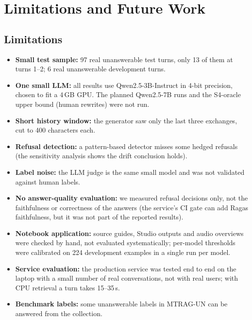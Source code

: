 \documentclass[11pt,a4paper]{report}
\newcommand{\sys}[1]{\textsf{#1}}
\begin{document}
\chapter{Limitations and Future Work}
\section{Limitations}
\begin{itemize}
\item \textbf{Small test sample:} 97 real unanswerable test turns, only 13 of them at turns 1--2; 6 real unanswerable development turns.
\item \textbf{One small LLM:} all results use Qwen2.5-3B-Instruct in 4-bit precision, chosen to fit a 4\,GB GPU. The planned Qwen2.5-7B runs and the \sys{S4-oracle} upper bound (human rewrites) were not run.
\item \textbf{Short history window:} the generator saw only the last three exchanges, cut to 400 characters each.
\item \textbf{Refusal detection:} a pattern-based detector misses some hedged refusals (the sensitivity analysis shows the drift conclusion holds).
\item \textbf{Label noise:} the LLM judge is the same small model and was not validated against human labels.
\item \textbf{No answer-quality evaluation:} we measured refusal decisions only, not the faithfulness or correctness of the answers (the service's CI gate can add Ragas faithfulness, but it was not part of the reported results).
\item \textbf{Notebook application:} source guides, Studio outputs and audio overviews were checked by hand, not evaluated systematically; per-model thresholds were calibrated on 224 development examples in a single run per model.
\item \textbf{Service evaluation:} the production service was tested end to end on the laptop with a small number of real conversations, not with real users; with CPU retrieval a turn takes 15--35\,s.
\item \textbf{Benchmark labels:} some unanswerable labels in MTRAG-UN can be answered from the collection.
\end{itemize}
\end{document}
